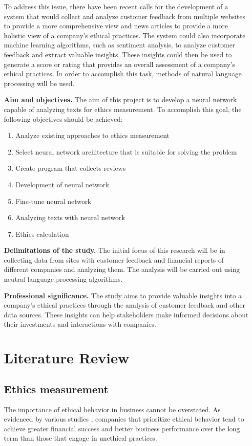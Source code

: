 \documentclass[PI]{ProjectProposal}
\begin{document}
To address this issue, there have been recent calls for the development of a system that would collect and analyze customer feedback from multiple websites to provide a more comprehensive view and news articles to provide a more holistic view of a company's ethical practices. The system could also incorporate machine learning algorithms, such as sentiment analysis, to analyze customer feedback and extract valuable insights. These insights could then be used to generate a score or rating that provides an overall assessment of a company's ethical practices. In order to accomplish this task, methods of natural language processing will be used.

\textbf{Aim and objectives.} The aim of this project is to develop a neural network capable of analyzing texts for ethics measurement. To accomplish this goal, the following objectives should be achieved:
\begin{enumerate}
\item Analyze existing approaches to ethics measurement
\item Select neural network architecture that is suitable for solving the problem
\item Create program that collects reviews
\item Development of neural network
\item Fine-tune neural network
\item Analyzing texts with neural network
\item Ethics calculation
\end{enumerate}

\textbf{Delimitations of the study.} The initial focus of this research will be in collecting data from sites with customer feedback and financial reports of different companies and analyzing them. The analysis will be carried out using neutral language processing algorithms.

\textbf{Professional significance.} The study aims to provide valuable insights into a company's ethical practices through the analysis of customer feedback and other data sources. These insights can help stakeholders make informed decisions about their investments and interactions with companies.
\chapter{Literature Review}
\label{sec:orga726d50}
\section{Ethics measurement}
\label{sec:org7c6782d}
The importance of ethical behavior in business cannot be overstated. As evidenced by various studies \autocites{climent_ethical_2018}[][]{mure_esg_2021}, companies that prioritize ethical behavior tend to achieve greater financial success and better business performance over the long term than those that engage in unethical practices.
\end{document}
